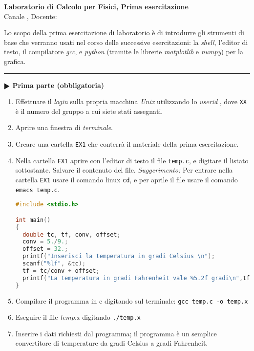 \documentclass[11pt]{article}
\begin{document}
\pagestyle{empty}

\begin{center}
{\Large \bf  Laboratorio di Calcolo per Fisici, Prima esercitazione\\[2mm]}
{\large Canale \canale, Docente: \docente}
\end{center}
\vspace{4mm}

\begin{mdframed}[backgroundcolor=panna]
  Lo scopo della prima esercitazione di laboratorio \`e di introdurre gli strumenti di base che verranno usati nel corso delle successive esercitazioni:
  la {\em shell}, l'editor di testo, il compilatore {\em gcc}, e {\em python\/} (tramite le librerie
  {\em matplotlib\/} e {\em numpy\/}) per la grafica.
\\
\end{mdframed}
%
%

\hrule
\vspace{2mm}
\textbf{$\RHD$ Prima parte (obbligatoria)} 
\begin{enumerate}
\item Effettuare il {\em login\/} sulla propria macchina {\em Unix\/} utilizzando lo {\em userid\/} \texttt{\login}, 
dove \texttt{XX} \`e il numero del gruppo a cui siete stati assegnati.
\item Aprire una finestra di {\em terminale}.
\item Creare una cartella  \texttt{EX1} che conterrà il materiale della prima esercitazione.
\item Nella cartella \texttt{EX1} aprire con l'editor di testo il file \texttt{temp.c}, e digitare il listato sottostante. Salvare il contenuto del file. {\em Suggerimento:} Per entrare nella cartella \texttt{EX1} usare il comando linux \texttt{cd}, e per aprile il file usare il comando \texttt{emacs temp.c}.
\begin{lstlisting}[caption={Programma \texttt{temp.c}},language=c]
#include <stdio.h>

int main()
{
  double tc, tf, conv, offset;
  conv = 5./9.;
  offset = 32.;
  printf("Inserisci la temperatura in gradi Celsius \n");
  scanf("%lf", &tc);
  tf = tc/conv + offset;
  printf("La temperatura in gradi Fahrenheit vale %5.2f gradi\n",tf);
}
\end{lstlisting}
\item Compilare il programma in c digitando sul terminale:
  \texttt{gcc temp.c -o temp.x}
\item Eseguire il file {\em temp.x\/} digitando \texttt{./temp.x}
\item Inserire i dati richiesti dal programma; il programma \`e un semplice convertitore di temperature da gradi Celsius a gradi Fahrenheit.
\end{enumerate}
\end{document}
